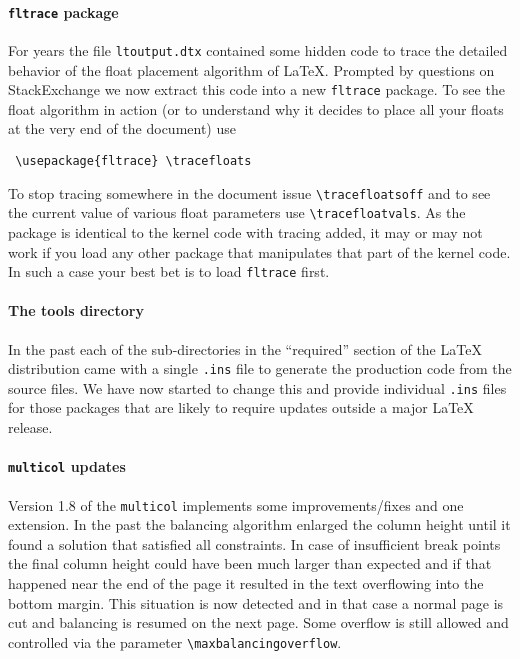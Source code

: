 \documentclass{ltnews}
\begin{document}
\paragraph{\texttt{fltrace} package}

For years the file \texttt{ltoutput.dtx} contained some hidden code to
trace the detailed behavior of the float placement algorithm of
\LaTeX. Prompted by questions on StackExchange we now extract this
code into a new \texttt{fltrace} package. To see the float algorithm
in action (or to understand why it decides to place all your floats at
the very end of the document) use
\begin{verbatim}
 \usepackage{fltrace} \tracefloats
\end{verbatim}
To stop tracing somewhere in the document issue
\verb=\tracefloatsoff= and to see the current value of various float
parameters use \verb=\tracefloatvals=. As the package is identical to
the kernel code with tracing added, it may or may not work if you load any
other package that manipulates that part of the kernel code. In such a
case your best bet is to load \texttt{fltrace} first.


\paragraph{The tools directory}

In the past each of the sub-directories in the ``required'' section of
the \LaTeX{} distribution came with a single \texttt{.ins} file to
generate the production code from the source files. We have now
started to change this and provide individual \texttt{.ins} files for
those packages that are likely to require updates outside a major
\LaTeX{} release.

\paragraph{\texttt{multicol} updates}

Version 1.8 of the \texttt{multicol} implements some
improvements/fixes and one extension. In the past the balancing
algorithm enlarged the column height until it found a solution that
satisfied all constraints. In case of insufficient break points the
final column height could have been much larger than expected and if
that happened near the end of the page it resulted in the text
overflowing into the bottom margin. This situation is now detected and
in that case a normal page is cut and balancing is resumed on the next
page. Some overflow is still allowed and controlled via the parameter
\verb=\maxbalancingoverflow=.
\end{document}
